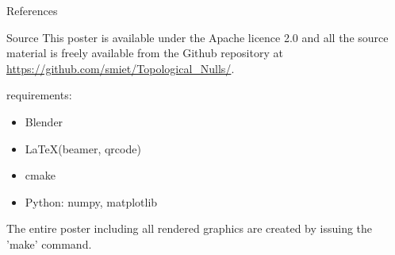 \documentclass[final]{beamer}
\newlength{\sepwid}
\newlength{\onecolwid}
\begin{document}
\begin{frame}[t]
\begin{columns}[t]
\begin{column}{\onecolwid}

\begin{block}{References}

\nocite{*} %
\small{
\vspace{0.75in}}

\end{block}

\begin{block}{Source}
This poster is available under the Apache licence 2.0 and all the source material is freely
available from the Github repository at \url{https://github.com/smiet/Topological_Nulls/}.

requirements:
\begin{itemize}
    \item Blender
    \item \LaTeX (beamer, qrcode)
    \item cmake
    \item Python: numpy, matplotlib
\end{itemize}

The entire poster including all rendered graphics are created by issuing the 'make' command.\\
\begin{centering}
\end{centering}

\end{block}

\end{column} %

\begin{column}{\sepwid}\end{column} %


\end{columns} %

\end{frame} %
\end{document}
